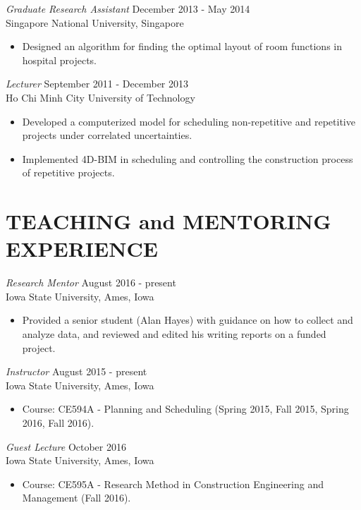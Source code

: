 \documentclass[11pt]{res}
\begin{document}
\begin{resume}
{\sl Graduate Research Assistant} \hfill December 2013 - May 2014 \\
Singapore National University, Singapore
\begin{itemize}
\item Designed an algorithm for finding the optimal layout of room functions in hospital projects.
\end{itemize}

{\sl Lecturer} \hfill September 2011 - December 2013 \\
Ho Chi Minh City University of Technology
\begin{itemize}
\item Developed a computerized model for scheduling non-repetitive and repetitive projects under correlated uncertainties.
\item Implemented 4D-BIM in scheduling and controlling the construction process of repetitive projects.
\end{itemize} 

 
\section{TEACHING and MENTORING EXPERIENCE}

{\sl Research Mentor} \hfill August 2016 - present \\
Iowa State University, Ames, Iowa
\begin{itemize}
\item Provided a senior student (Alan Hayes) with guidance on how to collect and analyze data, and reviewed and edited his writing reports on a funded project.
\end{itemize} 

{\sl Instructor} \hfill August 2015 - present \\
Iowa State University, Ames, Iowa
\begin{itemize}
\item Course: CE594A - Planning and Scheduling (Spring 2015, Fall 2015, Spring 2016, Fall 2016). 
\end{itemize}

{\sl Guest Lecture} \hfill October 2016 \\
Iowa State University, Ames, Iowa
\begin{itemize}
\item Course: CE595A - Research Method in Construction Engineering and Management (Fall 2016). 
\end{itemize}


\end{resume}
\end{document}
